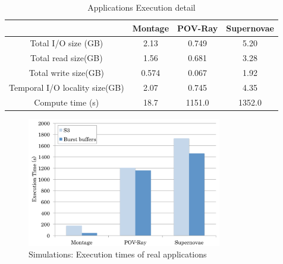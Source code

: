 \begin{table}
\centering
\begin{tabular}{|c|c|c|c|}
\hline
\rowcolor{darkgray} 						&	Montage		&		POV-Ray		&		Supernovae		\\\hline
\cellcolor{lightgray} Total I/O size (GB)	&	2.13	&		0.749	&		5.20		\\\hline
 \cellcolor{lightgray}Total read size(GB)	&	1.56	&		0.681	&		3.28		\\\hline
 \cellcolor{lightgray}Total write size(GB)	&	0.574	&		0.067	&		1.92		\\\hline
 \cellcolor{lightgray}Temporal I/O locality size(GB)	&	2.07	&		0.745	&		4.35	
 \\\hline \cellcolor{lightgray}Compute time (s)		&	18.7	&		1151.0	&	
 1352.0		\\
\hline
\end{tabular}
\caption{Applications Execution detail}
\label{evaluation:application execution detail}
\end{table}


\begin{figure}
\centering
\includegraphics[width=8.5cm]{img/workflows}
\caption{Simulations: Execution times of real applications}
\label{evaluation:simulation result montage}
\end{figure}


